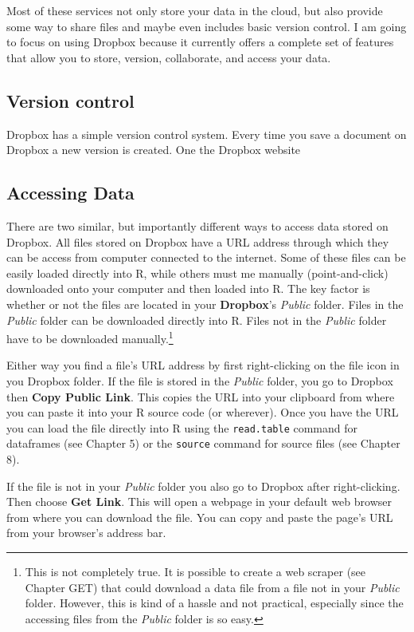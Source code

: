\documentclass[ChapterTOCs,krantz1]{krantz}\usepackage{graphicx, color}
\begin{document}
Most of these services not only store your data in the cloud, but also
provide some way to share files and maybe even includes basic version
control. I am going to focus on using Dropbox because it
currently offers a complete set of features that allow you to store,
version, collaborate, and access your data.

\subsection{Version control}

Dropbox has a simple version control system. Every time you
save a document on Dropbox a new version is created. One the
Dropbox website

\subsection{Accessing Data}

There are two similar, but importantly different ways to access data
stored on Dropbox. All files stored on Dropbox have a
URL address through which they can be access from computer connected to
the internet. Some of these files can be easily loaded directly into
R, while others must me manually (point-and-click) downloaded
onto your computer and then loaded into R. The key factor is
whether or not the files are located in your \textbf{Dropbox}'s
\emph{Public} folder. Files in the \emph{Public} folder can be
downloaded directly into R. Files not in the \emph{Public} folder
have to be downloaded manually.\footnote{This is not completely true. It
  is possible to create a web scraper (see Chapter GET) that could
  download a data file from a file not in your \emph{Public} folder.
  However, this is kind of a hassle and not practical, especially since
  the accessing files from the \emph{Public} folder is so easy.}

Either way you find a file's URL address by first right-clicking on the
file icon in you Dropbox folder. If the file is stored in the
\emph{Public} folder, you go to Dropbox then \textbf{Copy
Public Link}. This copies the URL into your clipboard from where you can
paste it into your R source code (or wherever). Once you have
the URL you can load the file directly into R using the
\texttt{read.table} command for dataframes (see Chapter 5) or the \texttt{source}
command for source files (see Chapter 8).

If the file is not in your \emph{Public} folder you also go to
Dropbox after right-clicking. Then choose \textbf{Get Link}.
This will open a webpage in your default web browser from where you can
download the file. You can copy and paste the page's URL from your
browser's address bar.
\end{document}
